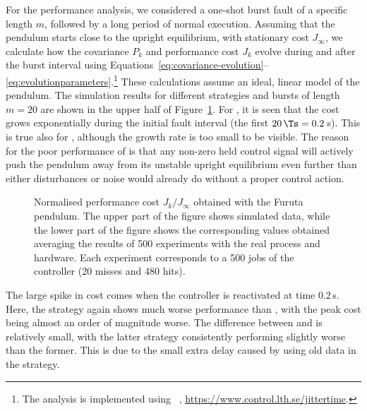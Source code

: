 For the performance analysis, we considered a one-shot burst fault of a specific length $m$, followed by a long period of normal execution. 
Assuming that the pendulum starts close to the upright equilibrium, with stationary cost $J_\infty$, we calculate how the covariance $P_k$ and performance cost $J_k$ evolve during and after the burst interval using Equations~\eqref{eq:covariance-evolution}--\eqref{eq:evolutionparameters}.\footnote{The analysis is implemented using ~\cite{Cervin:2019}, \url{https://www.control.lth.se/jittertime}.} 
These calculations assume an ideal, linear model of the pendulum. 
The simulation results for different strategies and bursts of length $m=20$ are shown in the upper half of Figure~\ref{fig:cost_simvsreal}. 
For \tH{}, it is seen that the cost grows exponentially during the initial fault interval (the first $20\,\Ts=0.2\,$s). 
This is true also for \tZ{}, although the growth rate is too small to be visible.
The reason for the poor performance of \tH{} is that any non-zero held control signal will actively push the pendulum away from its unstable upright equilibrium even further than either disturbances or noise would already do without a proper control action.
%
\begin{figure}
    \centering
    
    \caption{Normalised performance cost $J_k/J_\infty$ obtained with the Furuta pendulum.
        The upper part of the figure shows simulated data, while the lower part of the figure shows the corresponding values obtained averaging the results of 500 experiments with the real process and hardware.
        Each experiment corresponds to a 500 jobs of the controller (20 misses and 480 hits).}
    \label{fig:cost_simvsreal}
\end{figure}


The large spike in cost comes when the controller is reactivated at time $0.2\,$s. 
Here, the \tH{} strategy again shows much worse performance than \tZ{}, with the peak cost being almost an order of magnitude worse. 
The difference between \tK{} and \tS{} is relatively small, with the latter strategy consistently performing slightly worse than the former. 
This is due to the small extra delay caused by using old data in the \tS{} strategy.

